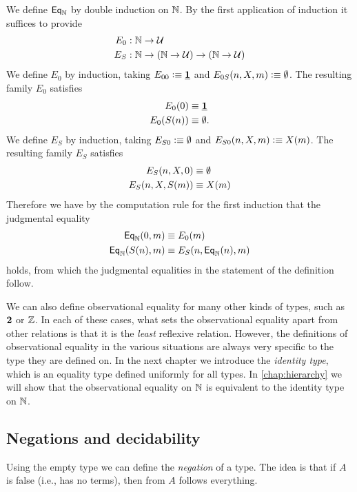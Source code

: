 \begin{constr}
We define $\mathsf{Eq}_\mathbb{N}$ by double induction on $\mathbb{N}$. By the first application of induction it suffices to provide
\begin{align*}
E_0 & : \mathbb{N}\to\mathcal{U} \\
E_S & : \mathbb{N}\to (\mathbb{N}\to\mathcal{U})\to(\mathbb{N}\to\mathcal{U})
\end{align*}
We define $E_0$ by induction, taking $E_{00}\vcentcolon\equiv \underline{\mathbf{1}}$ and $E_{0S}(n,X,m)\vcentcolon\equiv \emptyset$. The resulting family $E_0$ satisfies
\begin{align*}
E_0(0) & \equiv \underline{\mathbf{1}} \\
E_0(S(n)) & \equiv \emptyset.
\end{align*} 
We define $E_S$ by induction, taking $E_{S0}\vcentcolon\equiv \emptyset$ and $E_{S0}(n,X,m)\vcentcolon\equiv X(m)$. The resulting family $E_S$ satisfies
\begin{align*}
E_S(n,X,0) & \equiv \emptyset \\
E_S(n,X,S(m)) & \equiv X(m) 
\end{align*}
Therefore we have by the computation rule for the first induction that the judgmental equality
\begin{align*}
\mathsf{Eq}_\mathbb{N}(0,m) & \equiv E_0(m) \\
\mathsf{Eq}_\mathbb{N}(S(n),m) & \equiv E_S(n,\mathsf{Eq}_\mathbb{N}(n),m)
\end{align*}
holds, from which the judgmental equalities in the statement of the definition follow.
\end{constr}

We can also define observational equality for many other kinds of types, such as $\mathbf{2}$ or $\mathbb{Z}$. In each of these cases, what sets the observational equality apart from other relations is that it is the \emph{least} reflexive relation. However, the definitions of observational equality in the various situations are always very specific to the type they are defined on. In the next chapter we introduce the \emph{identity type}, which is an equality type defined uniformly for all types. In \cref{chap:hierarchy} we will show that the observational equality on $\mathbb{N}$ is equivalent to the identity type on $\mathbb{N}$.

\subsection{Negations and decidability}
Using the empty type we can define the \emph{negation} of a type. The idea is that if $A$ is false (i.e., has no terms), then from $A$ follows everything.

